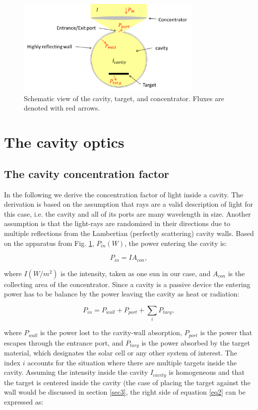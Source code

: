 \documentclass[a4paper]{article}
\begin{document}
\begin{figure}
\centering
\includegraphics[width=0.8\textwidth]{figures/cav3.png}
\caption{Schematic view of the cavity, target, and concentrator. Fluxes are denoted with red arrows.}
\label{fig:system}
\end{figure}

\section{The cavity optics}\label{sec2}
\subsection{The cavity concentration factor}

In the following we derive the concentration factor of light inside a cavity. The derivation is based on the assumption that rays are a valid description of light for this case, i.e. the cavity and all of its ports are many wavelength in size. Another assumption is that the light-rays are randomized in their directions due to multiple reflections from the Lambertian (perfectly scattering) cavity walls. Based on the apparatus from Fig. \ref{fig:system}, $P_{in} (W)$, the power entering the cavity is:

\begin{equation}\label{eq1}
P_{in}=IA_{con},
\end{equation}

\noindent where $I (W/m^2)$ is the intensity, taken as one sun in our case, and $A_{con}$ is the collecting area of the concentrator. Since a cavity is a passive device the entering power has to be balance by the power leaving the cavity as heat or radiation:

\begin{equation}\label{eq2}
P_{in}=P_{wall}+P_{port}+\sum_{i} P_{targ},
\end{equation}

\noindent where $P_{wall}$ is the power lost to the cavity-wall absorption, $P_{port}$ is the power that escapes through the entrance port, and $P_{targ}$ is the power absorbed by the target material, which designates the solar cell or any other system of interest. The index $i$ accounts for the situation where there are multiple targets inside the cavity. Assuming the intensity inside the cavity $I_{cavity}$ is homogeneous and that the target is centered inside the cavity (the case of placing the target against the wall would be discussed in section \ref{sec3}, the right side of equation \ref{eq2} can be expressed as:
\end{document}

